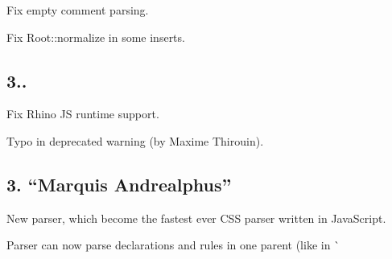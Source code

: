 \begin{DoxyItemize}
\item Fix empty comment parsing.
\item Fix {\ttfamily Root\+::normalize} in some inserts.
\end{DoxyItemize}

\subsection*{3..}


\begin{DoxyItemize}
\item Fix Rhino JS runtime support.
\item Typo in deprecated warning (by Maxime Thirouin).
\end{DoxyItemize}

\subsection*{3. “\+Marquis Andrealphus”}


\begin{DoxyItemize}
\item New parser, which become the fastest ever C\+SS parser written in Java\+Script.
\item Parser can now parse declarations and rules in one parent (like in \`{} 
\end{DoxyItemize}